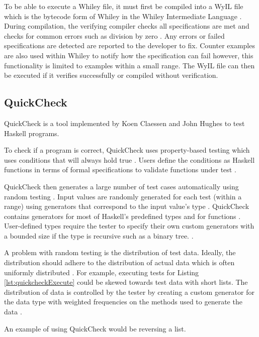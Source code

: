 To be able to execute a Whiley file, it must first be compiled into a WyIL file which is the bytecode form of Whiley in the Whiley Intermediate Language \cite{WhileyPlatform}.
During compilation, the verifying compiler checks all specifications are met and checks for common errors such as division by zero \cite{WhileyPlatform}. Any errors or failed specifications are detected are reported to the developer to fix. Counter examples are also used within Whiley to notify how the specification can fail however, this functionality is limited to examples within a small range.
The WyIL file can then be executed if it verifies successfully or compiled without verification.

\subsection{QuickCheck}
QuickCheck is a tool implemented by Koen Claessen and John Hughes \cite{QClightweight} to test Haskell programs.

To check if a program is correct, QuickCheck uses property-based testing which uses conditions that will always hold true \cite{QClightweight}.
Users define the conditions as Haskell functions in terms of formal specifications to validate functions under test \cite{QClightweight}. 

QuickCheck then generates a large number of test cases automatically using random testing \cite{QClightweight}. 
Input values are randomly generated for each test (within a range) using generators that correspond to the input value's type \cite{QClightweight}. 
QuickCheck contains generators for most of Haskell's predefined types and for functions \cite{QClightweight}. 
User-defined types require the tester to specify their own custom generators with a bounded size if the type is recursive such as a binary tree. \cite{QClightweight}. 

A problem with random testing is the distribution of test data. Ideally, the distribution should adhere to the distribution of actual data which is often uniformly distributed \cite{QClightweight}. 
For example, executing tests for Listing \ref{lst:quickcheckExecute} could be skewed towards test data with short lists. 
The distribution of data is controlled by the tester by creating a custom generator for the data type with weighted frequencies on the methods used to generate the data \cite{QClightweight}.

An example of using QuickCheck would be reversing a list.


